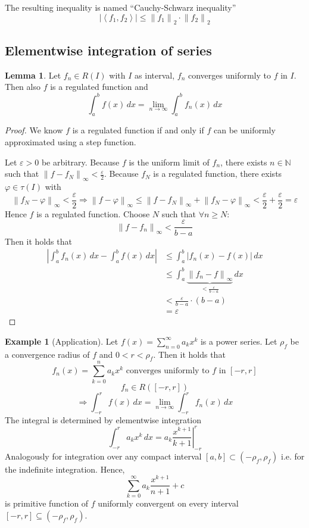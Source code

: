 \documentclass[a4paper,landscape,twocolumn]{article}
\theoremstyle{definition}
\newtheorem{ex}{Example}
\newtheorem{lemma}{Lemma}
\newcommand\abs[1]{\left|#1\right|}
\newcommand\norm[1]{\left\|#1\right\|}
\newcommand\inorm[1]{\left\|#1\right\|_\infty}
\newcommand\fun[1]{\left\langle{#1}\right\rangle}
\begin{document}
The resulting inequality is named \enquote{Cauchy-Schwarz inequality}
\[
  \abs{\fun{f_1, f_2}} \leq \norm{f_1}_2 \cdot \norm{f_2}_2
\]

\subsection{Elementwise integration of series}
%
\begin{lemma}
  Let $f_n \in R(I)$ with $I$ as interval, $f_n$ converges uniformly to $f$ in $I$.
  Then also $f$ is a regulated function and
  \[ \int_a^b f(x) \, dx = \lim_{n\to\infty} \int_a^b f_n(x) \, dx \]
\end{lemma}
\begin{proof}
  We know $f$ is a regulated function if and only if $f$ can be uniformly
  approximated using a step function.

  Let $\varepsilon > 0$ be arbitrary.
  Because $f$ is the uniform limit of $f_n$, there exists $n \in \mathbb N$
  such that $\inorm{f - f_N} < \frac\varepsilon2$. Because $f_N$ is a regulated
  function, there exists $\varphi \in \tau(I)$ with
  \[
    \inorm{f_N - \varphi} < \frac\varepsilon2 \Rightarrow
    \inorm{f - \varphi} \leq \inorm{f - f_N} + \inorm{f_N - \varphi}
    < \frac\varepsilon2 + \frac\varepsilon2 = \varepsilon
  \]
  Hence $f$ is a regulated function.
  Choose $N$ such that $\forall n \geq N$:
  \[ \inorm{f - f_n} < \frac\varepsilon{b - a} \]
  Then it holds that
  \begin{align*}
    \abs{\int_a^b f_n(x) \, dx - \int_a^b f(x) \, dx}
      &\leq \int_a^b \abs{f_n(x) - f(x)} \, dx \\
      &\leq \int_a^b \underbrace{\inorm{f_n - f}}_{< \frac\varepsilon{b - a}} \, dx \\
      &< \frac\varepsilon{b - a} \cdot (b - a) \\
      &= \varepsilon
  \end{align*}
\end{proof}

\begin{ex}[Application]
  Let $f(x) = \sum_{n=0}^\infty a_k x^k$ is a power series.
  Let $\rho_f$ be a convergence radius of $f$ and $0 < r < \rho_f$.
  Then it holds that
  \[ f_n(x) = \sum_{k=0}^n a_k x^k \text{ converges uniformly to $f$ in $[-r,r]$} \]
  \[ f_n \in R([-r,r]) \]
  \[
    \Rightarrow
    \int_{-r}^r f(x) \, dx
    = \lim_{n\to\infty} \int_{-r}^r f_n(x) \, dx
  \]
  The integral is determined by elementwise integration
  \[ \int_{-r}^r a_k x^k \, dx = \left. a_k \frac{x^{k+1}}{k+1} \right|_{-r}^r \]
  Analogously for integration over any compact interval $[a,b] \subset (-\rho_f, \rho_f)$
  i.e. for the indefinite integration. Hence,
  \[ \sum_{k=0}^\infty a_k \frac{x^{k+1}}{n+1} + c \]
  is primitive function of $f$ uniformly convergent on every interval
  $[-r,r] \subseteq (-\rho_f, \rho_f)$.
\end{ex}
\end{document}

